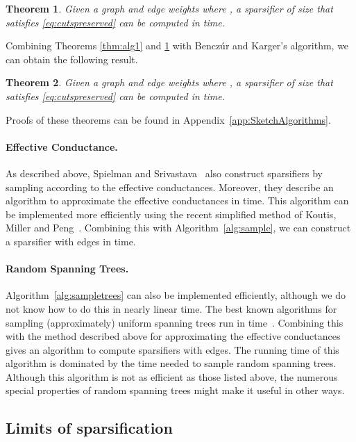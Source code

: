 \documentclass[11pt]{article}
\numberwithin{equation}{section}
\newtheorem{theorem}{Theorem}[section]
\newcommand{\Algorithm}[1]{Algorithm~\ref{alg:#1}}
\newcommand{\Appendix}[1]{Appendix~\ref{app:#1}}
\begin{document}
\begin{theorem}
\label{thm:alg2}
Given a graph  and edge weights 
where , 
a sparsifier  of size 
that satisfies \eqref{eq:cutspreserved} can be computed in  time.
\end{theorem}

Combining Theorems \ref{thm:alg1} and \ref{thm:alg2}
with Bencz\'ur and Karger's algorithm, we can obtain the following result.

\begin{theorem}
\label{thm:alg3}
Given a graph  and edge weights 
where ,
a sparsifier  of size 
that satisfies \eqref{eq:cutspreserved} can be computed in  time.
\end{theorem}

Proofs of these theorems can be found in \Appendix{SketchAlgorithms}.


\paragraph{Effective Conductance.}
As described above, Spielman and Srivastava~\cite{SS} also
construct sparsifiers by sampling according to the effective conductances.
Moreover, they describe an algorithm to approximate the effective conductances
in  time.
This algorithm can be implemented more efficiently using the recent simplified method of
Koutis, Miller and Peng~\cite{KMP}.
Combining this with \Algorithm{sample}, we can construct a sparsifier
with  edges in  time.


\paragraph{Random Spanning Trees.}
\Algorithm{sampletrees} can also be implemented efficiently,
although we do not know how to do this in nearly linear time.
The best known algorithms for sampling (approximately) uniform spanning trees
run in  time~\cite{CMN,KM}.
Combining this with the method described above for approximating the effective conductances
gives an algorithm to compute sparsifiers with  edges.
The running time of this algorithm is dominated by the time needed to sample
 random spanning trees.
Although this algorithm is not as efficient as those listed above,
the numerous special properties of random spanning trees 
might make it useful in other ways.




\subsection{Limits of sparsification}
\end{document}

